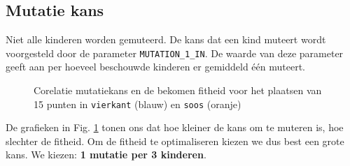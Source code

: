 \subsection{Mutatie kans}
Niet alle kinderen worden gemuteerd. De kans dat een kind muteert wordt voorgesteld door de parameter \texttt{MUTATION\_1\_IN}. De waarde van deze parameter geeft aan per hoeveel beschouwde kinderen er gemiddeld één muteert. 
\begin{figure}[H]

\caption{Corelatie mutatiekans en de bekomen fitheid voor het plaatsen van 15 punten in \texttt{vierkant} (blauw) en \texttt{soos} (oranje)}

\label{graf:mutation1In}
\end{figure}
De grafieken in Fig. \ref{graf:mutation1In} tonen ons dat hoe kleiner de kans om te muteren is, hoe slechter de fitheid. Om de fitheid te optimaliseren kiezen we dus best een grote kans. We kiezen: \textbf{1 mutatie per 3 kinderen}.



